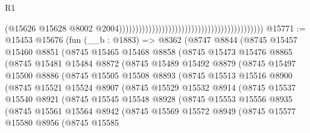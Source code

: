 \begin{lexlean}{R1}
\begin{coremodule}
                                                                                          (@15626
                                                                                            @15628
                                                                                            @8002
                                                                                            @2004))))))))))))))))))))))))))))))))))))))))))))
@15771 := @15453
    @15676
    (fun (__b : @1883) =>
    @8362
      (@8747
        @8844
        (@8745
          @15457
          @15460
          @8851
          (@8745
            @15465
            @15468
            @8858
            (@8745
              @15473
              @15476
              @8865
              (@8745
                @15481
                @15484
                @8872
                (@8745
                  @15489
                  @15492
                  @8879
                  (@8745
                    @15497
                    @15500
                    @8886
                    (@8745
                      @15505
                      @15508
                      @8893
                      (@8745
                        @15513
                        @15516
                        @8900
                        (@8745
                          @15521
                          @15524
                          @8907
                          (@8745
                            @15529
                            @15532
                            @8914
                            (@8745
                              @15537
                              @15540
                              @8921
                              (@8745
                                @15545
                                @15548
                                @8928
                                (@8745
                                  @15553
                                  @15556
                                  @8935
                                  (@8745
                                    @15561
                                    @15564
                                    @8942
                                    (@8745
                                      @15569
                                      @15572
                                      @8949
                                      (@8745
                                        @15577
                                        @15580
                                        @8956
                                        (@8745
                                          @15585

\end{coremodule}
\end{lexlean}
